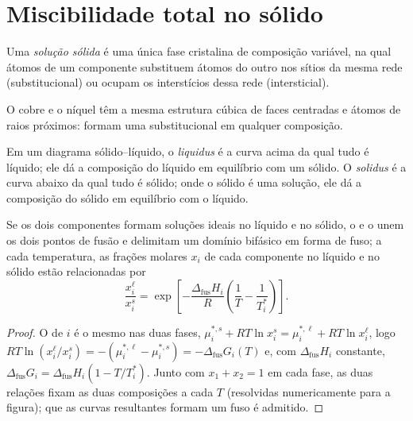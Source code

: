 \section{Miscibilidade total no sólido}

\begin{definition}\label{def:b2:solid-liquid-diagrams:solid-solution}
Uma \emph{solução sólida} é uma única fase cristalina de
composição variável, na qual átomos de um componente substituem átomos do
outro nos sítios da mesma rede (substitucional) ou ocupam os interstícios
dessa rede (intersticial).
\end{definition}

O cobre e o níquel têm a mesma estrutura cúbica de faces centradas e átomos de
raios próximos: formam uma  substitucional em qualquer composição.

\begin{definition}\label{def:b2:solid-liquid-diagrams:liquidus}
Em um diagrama sólido--líquido, o \emph{liquidus} é a curva
acima da qual tudo é líquido; ele dá a composição do líquido em equilíbrio
com um sólido. O \emph{solidus} é a curva abaixo da qual tudo
é sólido; onde o sólido é uma solução, ele dá a composição do sólido em
equilíbrio com o líquido.
\end{definition}

\begin{proposition}[O fuso]\label{prop:b2:solid-liquid-diagrams:lens}
Se os dois componentes formam soluções ideais no líquido e no sólido, o
 e o  unem os dois pontos de fusão e delimitam um domínio
bifásico em forma de fuso; a cada temperatura, as frações molares $x_i$ de
cada componente no líquido e no sólido estão relacionadas por
\[
  \frac{x_i^{\ell}}{x_i^{s}} = \exp\left[-\frac{\Delta_{\text{fus}}H_i}{R}\left(\frac1T - \frac1{T_i^*}\right)\right] .
\]
\end{proposition}

\begin{proof}
O  de $i$ é o mesmo nas duas fases, $\mu_i^{*,s} +
RT\ln x_i^s = \mu_i^{*,\ell} + RT\ln x_i^\ell$, logo $RT\ln(x_i^\ell/x_i^s) =
-(\mu_i^{*,\ell} - \mu_i^{*,s}) = -\Delta_{\text{fus}}G_i(T)$ e, com
$\Delta_{\text{fus}}H_i$ constante, $\Delta_{\text{fus}}G_i = \Delta_{\text{fus}}H_i(1 - T/T_i^*)$.
Junto com $x_1 + x_2 = 1$ em cada fase, as duas relações fixam as duas
composições a cada $T$ (resolvidas numericamente para a figura); que as
curvas resultantes formam um fuso é admitido.
\end{proof}

